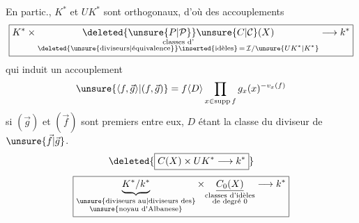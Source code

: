 En partic., $K^*$ et $UK^*$ sont orthogonaux, d'où des accouplements
\[
\boxed{K^*\times\underset{\substack{\text{classes d'}\\\deleted{\text{\unsure{diviseurs|équivalence}}}\inserted{\text{idèles}}\,=\,\mathcal I/\unsure{UK^*|K^*}}}{\deleted{\unsure{P|\mathcal P}}\unsure{C|\mathcal C}(X)}\longrightarrow k^*}
\]
qui induit un accouplement
\[
\unsure{\langle f,\vec g\rangle|(f,\vec g)}=f\langle D\rangle\prod_{x\in\operatorname{supp}f}g_x(x)^{-v_x(f)}
\]
si $(\vec g)$ et $(\vec f)$ sont premiers entre eux, $D$ étant la classe du diviseur de $\unsure{\vec f|\vec g}$.
\[
\deleted{\boxed{C(X)\times UK^*\longrightarrow k^*}}
\]
\[
\boxed{\underbrace{K^*/k^*}_{\substack{\text{\unsure{diviseurs au|diviseurs des}}\\\text{\unsure{noyau d\textquotesingle Albanese}}}}\times\underset{\substack{\text{classes d'idèles}\\\text{de degré }0}}{\underline{C_0(X)}}\longrightarrow k^*}
\]
